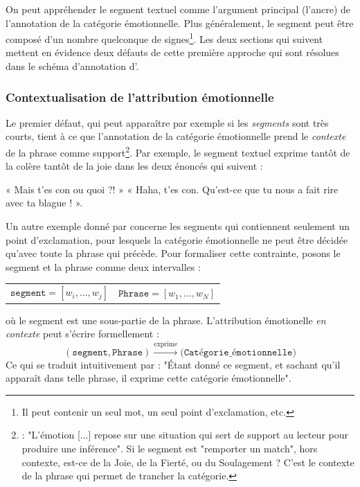 \documentclass[french, 11pt]{article}
\begin{document}
On peut appréhender le segment textuel comme l’argument principal (l'ancre) de l’annotation de la catégorie émotionnelle. Plus généralement, le segment peut être composé d'un nombre quelconque de signes\footnote{Il peut contenir un seul mot, un seul point d'exclamation, etc.}. Les deux sections qui suivent mettent en évidence deux défauts de cette première approche qui sont résolues dans le schéma d'annotation d'\textcite{etienne2021}.

\subsubsection*{Contextualisation de l'attribution émotionnelle}

Le premier défaut, qui peut apparaître par exemple si les \textit{segments} sont très courts, tient à ce que l'annotation de la catégorie émotionnelle prend le \textit{contexte} de la phrase comme support\footnote{\textcite[p.10]{etienne2021} : "L’émotion [...] repose sur une situation qui sert de support au lecteur pour produire une inférence". Si le segment est "remporter un match", hors contexte, est-ce de la Joie, de la Fierté, ou du Soulagement ? C'est le contexte de la phrase qui permet de trancher la catégorie.}. Par exemple, le segment textuel  exprime tantôt de la colère tantôt de la joie dans les deux énoncés qui suivent :

« Mais t’es con ou quoi ?! »
« Haha, t'es con. Qu'est-ce que tu nous a fait rire avec ta blague ! ».

Un autre exemple donné par \textcite[p.8]{etienne2021} concerne les segments qui contiennent seulement un point d'exclamation, pour lesquels la catégorie émotionnelle ne peut être décidée qu'avec toute la phrase qui précède.
Pour formaliser cette contrainte, posons le segment et la phrase comme deux intervalles :

\begin{center}
\begin{tabular}{c@{\hspace{2cm}}c}
$\texttt{segment} = [w_i, \ldots, w_j]$ & $\texttt{Phrase} = [w_1, \ldots, w_N]$
\end{tabular}
\end{center}

\noindent où le segment est une sous-partie de la phrase. L'attribution émotionelle \textit{en contexte} peut s'écrire formellement :
\[
(\texttt{segment}, \texttt{Phrase}) \xrightarrow{\text{exprime}} \texttt{(Catégorie\_émotionnelle)}
\]
Ce qui se traduit intuitivement par : "Étant donné ce segment, et sachant qu'il apparaît dans telle phrase, il exprime cette catégorie émotionnelle".
\end{document}

